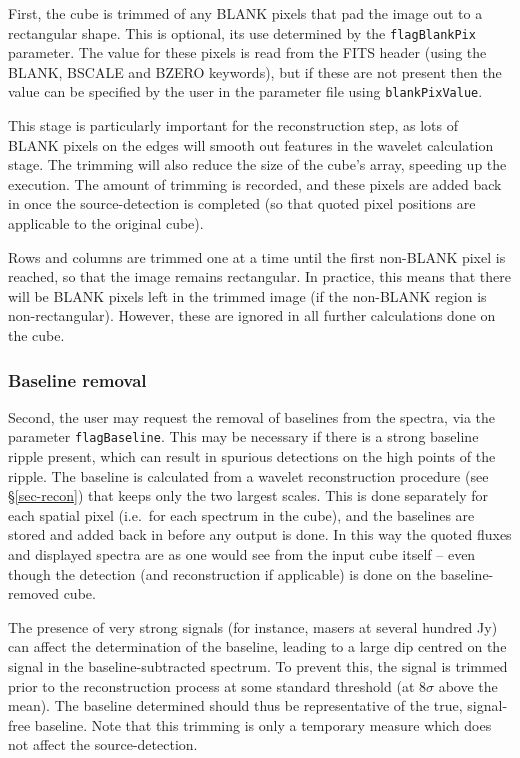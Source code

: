\documentclass[12pt,a4paper]{article}
\newcommand{\ie}{i.e.\ }
\begin{document}
First, the cube is trimmed of any BLANK pixels that pad the image out
to a rectangular shape. This is optional, its use determined by the
\texttt{flagBlankPix} parameter. The value for these pixels is read from
the FITS header (using the BLANK, BSCALE and BZERO keywords), but if
these are not present then the value can be specified by the user in
the parameter file using \texttt{blankPixValue}.

This stage is particularly important for the reconstruction step, as
lots of BLANK pixels on the edges will smooth out features in the
wavelet calculation stage. The trimming will also reduce the size of
the cube's array, speeding up the execution. The amount of trimming is
recorded, and these pixels are added back in once the source-detection
is completed (so that quoted pixel positions are applicable to the
original cube).

Rows and columns are trimmed one at a time until the first non-BLANK
pixel is reached, so that the image remains rectangular. In practice,
this means that there will be BLANK pixels left in the trimmed image
(if the non-BLANK region is non-rectangular). However, these are
ignored in all further calculations done on the cube.

\subsubsection{Baseline removal}

Second, the user may request the removal of baselines from the
spectra, via the parameter \texttt{flagBaseline}. This may be necessary
if there is a strong baseline ripple present, which can result in
spurious detections on the high points of the ripple. The baseline is
calculated from a wavelet reconstruction procedure (see
\S\ref{sec-recon}) that keeps only the two largest scales. This is
done separately for each spatial pixel (\ie for each spectrum in the
cube), and the baselines are stored and added back in before any
output is done. In this way the quoted fluxes and displayed spectra
are as one would see from the input cube itself -- even though the
detection (and reconstruction if applicable) is done on the
baseline-removed cube.

The presence of very strong signals (for instance, masers at several
hundred Jy) can affect the determination of the baseline, leading to a
large dip centred on the signal in the baseline-subtracted
spectrum. To prevent this, the signal is trimmed prior to the
reconstruction process at some standard threshold (at $8\sigma$ above
the mean). The baseline determined should thus be representative of
the true, signal-free baseline. Note that this trimming is only a
temporary measure which does not affect the source-detection.
\end{document}

